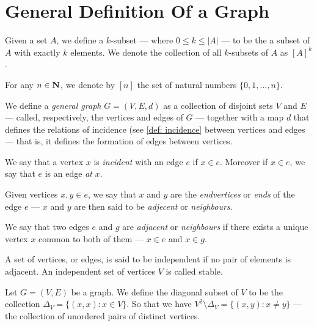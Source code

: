 \section{General Definition Of a Graph}

\begin{notation}[\(k\)-subsets]
  Given a set \(A\), we define a \(k\)-subset --- where \(0 \leq k \leq |A|\)
  --- to be the a subset of \(A\) with exactly \(k\) elements. We denote the
  collection of all \(k\)-subsets of \(A\) as \([A]^k\).
\end{notation}

\begin{notation}[Range]
  For any \(n \in \mathbf{N}\), we denote by \([n]\) the set of natural numbers \(\{0,
  1, \dots, n\}\).
\end{notation}

\begin{definition}\label{def: general-graph}
   We define a \emph{general graph} \(G = (V, E, d)\) as a collection of
   disjoint sets \(V\) and \(E\) --- called, respectively, the vertices and
   edges of \(G\) --- together with a map \(d\) that defines the relations of
   incidence (see \cref{def: incidence} between vertices and edges --- that is,
   it defines the formation of edges between vertices.
\end{definition}

\begin{definition}[Incidence]\label{def: incidence}
  We say that a vertex \(x\) is \emph{incident} with an edge \(e\) if \(x \in
  e\). Moreover if \(x \in e\), we say that \(e\) is an edge \emph{at} \(x\).
\end{definition}

\begin{definition}[Adjacency]
  Given vertices \(x, y \in e\), we say that \(x\) and \(y\) are the
  \emph{endvertices} or \emph{ends} of the edge \(e\) --- \(x\) and \(y\) are
  then said to be \emph{adjecent} or \emph{neighbours}.

  We say that two edges \(e\) and \(g\) are \emph{adjacent} or \emph{neighbours}
  if there exists a unique vertex \(x\) common to both of them --- \(x \in e\)
  and \(x \in g\).

  A set of vertices, or edges, is said to be independent if no pair of elements
  is adjacent. An independent set of vertices \(V\) is called stable.
\end{definition}

\begin{definition}
  Let \(G = (V, E)\) be a graph. We define the diagonal subset of \(V\) to be
  the collection \(\Delta_V = \{(x, x) : x \in V\}\). So that we have
  \(V^2 \setminus \Delta_V = \{(x, y) : x \neq y\}\) --- the collection of
  unordered pairs of distinct vertices.
\end{definition}


